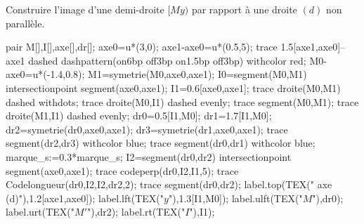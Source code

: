 \begin{methode*1}
\begin{myBox}{}
\begin{minipage}{\linewidth}
                \creditInstrumentPoche
            \end{minipage}
        \end{myBox}
    \end{methode*1}
    \begin{methode*1}
        \exercice
        Construire l'image d'une demi-droite $[My)$ par rapport à une droite $(d)$ non parallèle.
        \correction
        \begin{minipage}{0.35\linewidth}
            \begin{center}
                \begin{Geometrie}[CoinHD={(6u,3.5u)},CoinBG={(0,0)}]
                    pair M[],I[],axe[],dr[];
                    axe0=u*(3,0);
                    axe1-axe0=u*(0.5,5);                
                    trace 1.5[axe1,axe0]--axe1 dashed dashpattern(on6bp off3bp on1.5bp off3bp) withcolor red;
                    M0-axe0=u*(-1.4,0.8);
                    M1=symetrie(M0,axe0,axe1);
                    I0=segment(M0,M1) intersectionpoint segment(axe0,axe1);
                    I1=0.6[axe0,axe1];
                    trace droite(M0,M1) dashed withdots;
                    trace droite(M0,I1) dashed evenly;
                    trace segment(M0,M1);
                    trace droite(M1,I1) dashed evenly;
                    dr0=0.5[I1,M0];
                    dr1=1.7[I1,M0];
                    dr2=symetrie(dr0,axe0,axe1);
                    dr3=symetrie(dr1,axe0,axe1);
                    trace segment(dr2,dr3) withcolor blue;
                    trace segment(dr0,dr1) withcolor blue;                    
                    marque_s:=0.3*marque_s;
                    I2=segment(dr0,dr2) intersectionpoint segment(axe0,axe1);
                    trace codeperp(dr0,I2,I1,5);
                    trace Codelongueur(dr0,I2,I2,dr2,2);
                    trace segment(dr0,dr2);
                    label.top(TEX("{\color{red} axe (d)}"),1.2[axe1,axe0]);                
                    label.lft(TEX("$y$"),1.3[I1,M0]);
                    label.ulft(TEX("$M$"),dr0);
                    label.urt(TEX("$M'$"),dr2);
                    label.rt(TEX("$I$"),I1);
                \end{Geometrie}
            \end{center}
        \end{minipage}
        \begin{minipage}{0.65\linewidth}
            \begin{enumerate}

\end{enumerate}
\end{minipage}
\end{methode*1}
